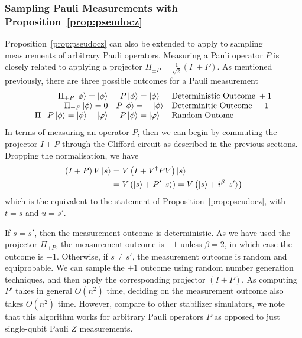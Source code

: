 \subsubsection*{Sampling Pauli Measurements with Proposition~\ref{prop:pseudocz}}
Proposition~\ref{prop:pseudocz} can also be extended to apply to sampling measurements of arbitrary Pauli operators. Measuring a Pauli operator $P$ is closely related to applying a projector $\Pi_{\pm P}=\frac{1}{\sqrt{2}}\left(I\ \pm P\right)$. As mentioned previously, there are three possible outcomes for a Pauli measurement
\[
\begin{array}{r c l}
\Pi_{+P}\ket{\phi} = \ket{\phi} & P\ket{\phi} = \ket{\phi} & \text{Deterministic Outcome}\;+1\\
\Pi_{+P}\ket{\phi} = 0 & P\ket{\phi} = -\ket{\phi} & \text{Determinitic Outcome}\; -1\\
\Pi{+P}\ket{\phi} = \ket{\phi}+\ket{\varphi} & P\ket{\phi}=\ket{\varphi} & \text{Random Outome} \\
\end{array}
\]
In terms of measuring an operator $P$, then we can begin by commuting the projector $I+P$ through the Clifford circuit as described in the previous sections. Dropping the normalisation, we have
\begin{align*}
\left(I+P\right)V\ket{s} &= V\left(I+V^{\dagger}PV\right)\ket{s} \\
& = V\left(\ket{s}+P'\ket{s}\right) = V\left(\ket{s}+i^{\beta}\ket{s'}\right)
\end{align*}
which is the equivalent to the statement of Proposition~\ref{prop:pseudocz}, with $t=s$ and $u=s'$.\par
If $s=s'$, then the measurement outcome is deterministic. As we have used the projector $\Pi_{+P}$, the measurement outcome is $+1$ unless $\beta=2$, in which case the outcome is $-1$. Otherwise, if $s\neq s'$, the measurement outcome is random and equiprobable. We can sample the $\pm 1$ outcome using random number generation techniques, and then apply the corresponding projector $\left(I\pm P\right)$. As computing $P'$ takes in general $O(n^{2})$ time, deciding on the measurement outcome also takes $O(n^{2})$ time. However, compare to other stabilizer simulators, we note that this algorithm works for arbitrary Pauli operators $P$ as opposed to just single-qubit Pauli $Z$ measurements.
